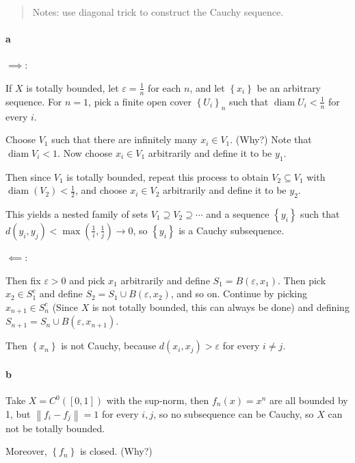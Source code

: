 \begin{solution}

\hfill

\begin{concept}

\hfill

\end{concept}

\begin{quote}
Notes: use diagonal trick to construct the Cauchy sequence.
\end{quote}

\hypertarget{a-6}{%
\paragraph{a}\label{a-6}}

\(\implies\):

If \(X\) is totally bounded, let \(\varepsilon = \frac 1 n\) for each
\(n\), and let \(\left\{{x_i}\right\}\) be an arbitrary sequence. For
\(n=1\), pick a finite open cover \(\left\{{U_i}\right\}_n\) such that
\({\operatorname{diam}}{U_i} < \frac 1 n\) for every \(i\).

Choose \(V_1\) such that there are infinitely many \(x_i \in V_1\).
(Why?) Note that \({\operatorname{diam}}V_i < 1\). Now choose
\(x_i \in V_1\) arbitrarily and define it to be \(y_1\).

Then since \(V_1\) is totally bounded, repeat this process to obtain
\(V_2 \subseteq V_1\) with \({\operatorname{diam}}(V_2)< \frac 1 2\),
and choose \(x_i \in V_2\) arbitrarily and define it to be \(y_2\).

This yields a nested family of sets
\(V_1 \supseteq V_2 \supseteq \cdots\) and a sequence
\(\left\{{y_i}\right\}\) such that
\(d(y_i, y_j) < \max(\frac 1 i, \frac 1 j) \to 0\), so
\(\left\{{y_i}\right\}\) is a Cauchy subsequence.

\(\impliedby\):

Then fix \(\varepsilon > 0\) and pick \(x_1\) arbitrarily and define
\(S_1 = B(\varepsilon, x_1)\). Then pick \(x_2 \in S_1^c\) and define
\(S_2 = S_1 \cup B(\varepsilon, x_2)\), and so on. Continue by picking
\(x_{n+1} \in S_n^c\) (Since \(X\) is not totally bounded, this can
always be done) and defining
\(S_{n+1} = S_n \cup B(\varepsilon, x_{n+1})\).

Then \(\left\{{x_n}\right\}\) is not Cauchy, because
\(d(x_i, x_j) > \varepsilon\) for every \(i\neq j\).

\hypertarget{b-6}{%
\paragraph{b}\label{b-6}}

Take \(X = C^0([0, 1])\) with the sup-norm, then \(f_n(x) = x^n\) are
all bounded by 1, but \({\left\lVert {f_i - f_j} \right\rVert} = 1\) for
every \(i, j\), so no subsequence can be Cauchy, so \(X\) can not be
totally bounded.

Moreover, \(\left\{{f_n}\right\}\) is closed. (Why?)

\end{solution}

